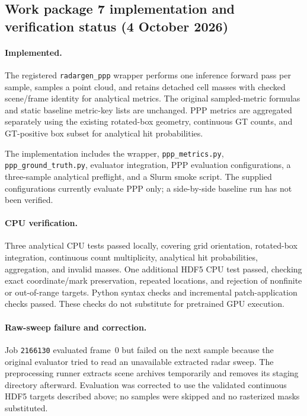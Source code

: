 \documentclass[11pt,a4paper]{article}
\begin{document}
\subsection*{Work package 7 implementation and verification status
(4 October 2026)}

\paragraph{Implemented.}
The registered \texttt{radargen\_ppp} wrapper performs one inference
forward pass per sample, samples a point cloud, and retains detached
cell masses with checked scene/frame identity for analytical metrics.
The original sampled-metric formulas and static baseline metric-key lists
are unchanged. PPP metrics are aggregated separately using the existing
rotated-box geometry, continuous GT counts, and GT-positive box subset
for analytical hit probabilities.

The implementation includes the wrapper, \texttt{ppp\_metrics.py},
\texttt{ppp\_ground\_truth.py}, evaluator integration, PPP evaluation
configurations, a three-sample analytical preflight, and a Slurm smoke
script. The supplied configurations currently evaluate PPP only; a
side-by-side baseline run has not been verified.

\paragraph{CPU verification.}
Three analytical CPU tests passed locally, covering grid orientation,
rotated-box integration, continuous count multiplicity, analytical hit
probabilities, aggregation, and invalid masses. One additional HDF5 CPU
test passed, checking exact coordinate/mark preservation, repeated
locations, and rejection of nonfinite or out-of-range targets.
Python syntax checks and incremental patch-application checks passed.
These checks do not substitute for pretrained GPU execution.

\paragraph{Raw-sweep failure and correction.}
Job \texttt{2166130} evaluated frame~0 but failed on the next sample
because the original evaluator tried to read an unavailable extracted
radar sweep. The preprocessing runner extracts scene archives temporarily
and removes its staging directory afterward. Evaluation was corrected to
use the validated continuous HDF5 targets described above; no samples
were skipped and no rasterized masks substituted.
\end{document}

